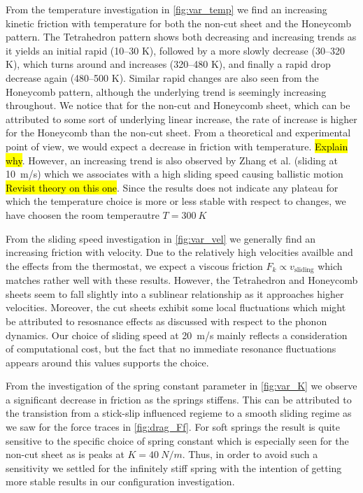 From the temperature investigation in \cref{fig:var_temp} we find an increasing
kinetic friction with temperature for both the non-cut sheet and the Honeycomb
pattern. The Tetrahedron pattern shows both decreasing and increasing trends as
it yields an initial rapid (10--30 K), followed by a more slowly decrease
(30--320 K), which turns around and increases (320--480 K), and finally a rapid
drop decrease again (480--500 K). Similar rapid changes are also seen from the
Honeycomb pattern, although the underlying trend is seemingly increasing
throughout. We notice that for the non-cut and Honeycomb sheet, which can be
attributed to some sort of underlying linear increase, the rate of increase is
higher for the Honeycomb than the non-cut sheet. From a theoretical and
experimental point of view, we would expect a decrease in friction with
temperature. \hl{Explain why}. However, an increasing trend is also observed by Zhang et al.
\cite{ma12091425} (sliding at \SI{10}{m/s}) which we associates with a high
sliding speed causing ballistic motion \hl{Revisit theory on this one}. Since
the results does not indicate any plateau for which the temperature choice is
more or less stable with respect to changes, we have choosen the room
temperautre $T = \SI{300}{K}$ 


From the sliding speed investigation in \cref{fig:var_vel} we generally find an increasing friction with velocity. Due to the relatively high velocities availble and the effects from the thermostat, we expect a viscous friction $F_k \propto v_{\text{sliding}}$ which matches rather well with these results. However, the Tetrahedron and Honeycomb sheets seem to fall slightly into a sublinear relationship as it approaches higher velocities. Moreover, the cut sheets exhibit some local fluctuations which might be attributed to resosnance effects as discussed with respect to the phonon dynamics. Our choice of sliding speed at \SI{20}{m/s} mainly reflects a consideration of computational cost, but the fact that no immediate resonance fluctuations appears around this values supports the choice.  

From the investigation of the spring constant parameter in \cref{fig:var_K} we observe a significant decrease in friction as the springs stiffens. This can be attributed to the transistion from a stick-slip influenced regieme to a smooth sliding regime as we saw for the force traces in \cref{fig:drag_Ff}. For soft springs the result is quite sensitive to the specific choice of spring constant which is especially seen for the non-cut sheet as is peaks at $K = \SI{40}{N/m}$. Thus, in order to avoid such a sensitivity we settled for the infinitely stiff spring with the intention of getting more stable results in our configuration investigation.


